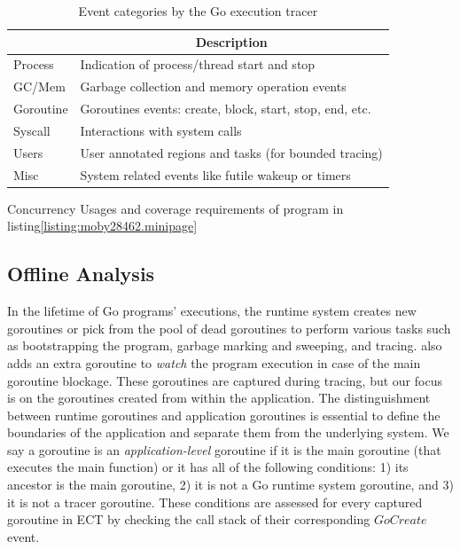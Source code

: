 \begin{table}[]
    \centering
        \caption{Event categories by the Go execution tracer}
        \begin{tabular}{|l|l|}
        \hline
        \rowcolor[HTML]{C0C0C0}
        \multicolumn{1}{|c|}{\cellcolor[HTML]{C0C0C0}\textbf{Category}} & \multicolumn{1}{c|}{\cellcolor[HTML]{C0C0C0}\textbf{Description}} \\ \hline
        Process & Indication of process/thread start and stop \\ \hline
        GC/Mem & Garbage collection and memory operation events\\ \hline
        Goroutine & Goroutines events: create, block, start, stop, end, etc. \\ \hline
        Syscall & Interactions with system calls \\ \hline
        Users & User annotated regions and tasks (for bounded tracing) \\ \hline
        Misc & System related events like futile wakeup or timers \\ \hline
        \end{tabular}
    \label{tab:events}
\end{table}


\begin{table}[]
\centering
\caption{Concurrency Usages and coverage requirements of program in listing\ref{listing:moby28462.minipage}}
\scalebox{0.82}{

}
\label{tab:moby_cov_table}
\end{table}

\subsection{Offline Analysis}
\label{sec:ch4_offline_analysis}
In the lifetime of Go programs' executions, the runtime system creates new goroutines or pick from the pool of dead goroutines to perform various tasks such as bootstrapping the program, garbage marking and sweeping, and tracing.
%
\goat also adds an extra goroutine to \textit{watch} the program execution in case of the main goroutine blockage.
%
These goroutines are captured during tracing, but our focus is on the goroutines created from within the application.
%
The distinguishment between runtime goroutines and application goroutines is essential to define the boundaries of the application and separate them from the underlying system.
%
We say a goroutine is an \textit{application-level} goroutine if it is the main goroutine (that executes the main function) or it has all of the following conditions:
1) its ancestor is the main goroutine,
2) it is not a Go runtime system goroutine, and
3) it is not a tracer goroutine.
These conditions are assessed for every captured goroutine in ECT by checking the call stack of their corresponding $GoCreate$ event.

